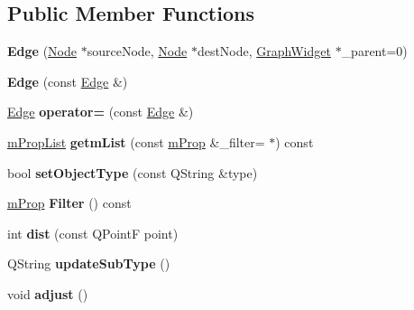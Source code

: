 \subsection*{Public Member Functions}
\begin{DoxyCompactItemize}
\item 
\mbox{\label{class_edge_abb15e1ccf99ec6abe0f5daff8e3cc892}} 
{\bfseries Edge} (\hyperlink{class_node}{Node} $\ast$source\+Node, \hyperlink{class_node}{Node} $\ast$dest\+Node, \hyperlink{class_graph_widget}{Graph\+Widget} $\ast$\+\_\+parent=0)
\item 
\mbox{\label{class_edge_ac006830d996719be94e4d2b8b89034bd}} 
{\bfseries Edge} (const \hyperlink{class_edge}{Edge} \&)
\item 
\mbox{\label{class_edge_a4e38a0d8bfc714ac5764eaca140456b1}} 
\hyperlink{class_edge}{Edge} {\bfseries operator=} (const \hyperlink{class_edge}{Edge} \&)
\item 
\mbox{\label{class_edge_ab12d787f1089a4be6c97ef73f24e375f}} 
\hyperlink{classm_prop_list}{m\+Prop\+List} {\bfseries getm\+List} (const \hyperlink{classm_prop}{m\+Prop} \&\+\_\+filter=\textquotesingle{} $\ast$\textquotesingle{}) const
\item 
\mbox{\label{class_edge_a975108d0a46df57014c375441cbca06c}} 
bool {\bfseries set\+Object\+Type} (const Q\+String \&type)
\item 
\mbox{\label{class_edge_a7ed39707132ce3d9702e50bb3d360092}} 
\hyperlink{classm_prop}{m\+Prop} {\bfseries Filter} () const
\item 
\mbox{\label{class_edge_aa28eef9ce92d5d40c03531d747f3f7ef}} 
int {\bfseries dist} (const Q\+PointF point)
\item 
\mbox{\label{class_edge_aa0e7d3ed3af1dfb7e2c0fdf6e8cf2d91}} 
Q\+String {\bfseries update\+Sub\+Type} ()
\item 
\mbox{\label{class_edge_ab554a765fd7a57fcdf289aa51b4df328}} 
void {\bfseries adjust} ()
\item 
\mbox{\label{class_edge_a40232061c6777bee5cd641b51802ee0c}} 

\end{DoxyCompactItemize}
